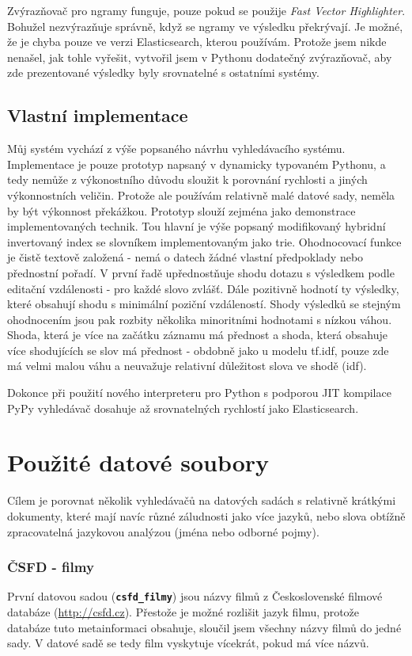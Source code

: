 \documentclass[11pt,letterpaper,oneside,openright]{book}
\newcommand{\bftt}[1]{\texttt{\textbf{#1}}}
\begin{document}
Zvýrazňovač pro ngramy funguje, pouze pokud se použije \textit{Fast Vector
Highlighter}. Bohužel nezvýrazňuje správně, když se ngramy ve výsledku
překrývají. Je možné, že je chyba pouze ve verzi Elasticsearch, kterou
používám. Protože jsem nikde nenašel, jak tohle vyřešit, vytvořil jsem v
Pythonu dodatečný zvýrazňovač, aby zde prezentované výsledky byly srovnatelné s
ostatními systémy.

\subsection{Vlastní implementace}
Můj systém vychází z výše popsaného návrhu vyhledávacího systému. Implementace
je pouze prototyp napsaný v dynamicky typovaném Pythonu, a tedy nemůže z
výkonostního důvodu sloužit k porovnání rychlosti a jiných výkonnostních
veličin. Protože ale používám relativně malé datové sady, neměla by být
výkonnost překážkou. Prototyp slouží zejména jako demonstrace implementovaných
technik. Tou hlavní je výše popsaný modifikovaný hybridní invertovaný index se
slovníkem implementovaným jako trie.  Ohodnocovací funkce je čistě textově
založená - nemá o datech žádné vlastní předpoklady nebo přednostní pořadí. V
první řadě upřednostňuje shodu dotazu s výsledkem podle editační vzdálenosti -
pro každé slovo zvlášť. Dále pozitivně hodnotí ty výsledky, které obsahují
shodu s minimální poziční vzdáleností.  Shody výsledků se stejným ohodnocením
jsou pak rozbity několika minoritními hodnotami s nízkou váhou. Shoda, která je
více na začátku záznamu má přednost a shoda, která obsahuje více shodujících se
slov má přednost - obdobně jako u modelu tf.idf, pouze zde má velmi malou váhu
a neuvažuje relativní důležitost slova ve shodě (idf).

Dokonce při použití nového interpreteru pro Python s podporou JIT
kompilace PyPy vyhledávač dosahuje až srovnatelných rychlostí jako
Elasticsearch.


\section{Použité datové soubory}
Cílem je porovnat několik vyhledávačů na datových sadách s relativně krátkými
dokumenty, které mají navíc různé záludnosti jako více jazyků, nebo slova
obtížně zpracovatelná jazykovou analýzou (jména nebo odborné pojmy).

\subsubsection{ČSFD - filmy}
První datovou sadou (\bftt{csfd\_filmy}) jsou názvy filmů z Československé
filmové databáze (\url{http://csfd.cz}). Přestože je možné rozlišit jazyk
filmu, protože databáze tuto metainformaci obsahuje, sloučil jsem všechny názvy
filmů do jedné sady. V datové sadě se tedy film vyskytuje vícekrát, pokud má
více názvů.
\end{document}

